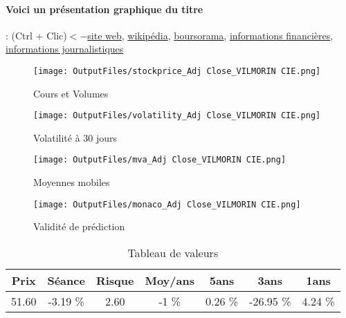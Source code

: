 \documentclass[11pt,a4paper]{report}%
\begin{document}
\paragraph{Voici un présentation graphique du titre} : (Ctrl + Clic)$<-$\href{https://www.vilmorincie.com/fr/investisseurs-analystes/}{site web}, \href{https://fr.wikipedia.org/wiki/Vilmorin_%26_Cie}{wikipédia}, \href{https://www.boursorama.com/cours/1rPRIN}{boursorama}, \href{https://www.qwant.com/?q=site:https:%2f%2fwww.easybourse.com%2faction-societe%2fVILMORIN-CIE&t=web&client=ext-firefox-hp}{informations financières}, \href{https://bourse.lerevenu.com/cours-de-bourse/fiche-valeur-synthese/VILMORIN-CIE/RIN-FR}{informations journalistiques}
\begin{figure}[!htb]
   \begin{minipage}{0.5\textwidth}
     \centering
     \texttt{[image: OutputFiles/stockprice\_Adj Close\_VILMORIN CIE.png]}
     \caption{Cours et Volumes}\label{Fig:price_VILMORIN CIE}
   \end{minipage}\hfill
   \begin{minipage}{0.5\textwidth}
     \centering
     \texttt{[image: OutputFiles/volatility\_Adj Close\_VILMORIN CIE.png]}
     \caption{Volatilité à 30 jours}\label{Fig:volat_VILMORIN CIE}
   \end{minipage}
\end{figure}
\begin{figure}[!htb]
   \begin{minipage}{0.5\textwidth}
     \centering
     \texttt{[image: OutputFiles/mva\_Adj Close\_VILMORIN CIE.png]}
     \caption{Moyennes mobiles}\label{Fig:mva_VILMORIN CIE}
   \end{minipage}\hfill
   \begin{minipage}{0.5\textwidth}
     \centering
     \texttt{[image: OutputFiles/monaco\_Adj Close\_VILMORIN CIE.png]}
     \caption{Validité de prédiction}\label{Fig:prediction_VILMORIN CIE}
   \end{minipage}
\end{figure}

\begin{table}[H]
  \centering
    \begin{tabular}{|c|c|c|c|c|c|c|}
    \hline
    Prix & Séance & Risque  & Moy/ans & 5ans & 3ans & 1ans \\
    \hline
    51.60 &    -3.19 \%    & 2.60 & -1 \% & 0.26 \% & -26.95 \% & 4.24 \% \\
    \hline
    \end{tabular}%
        \label{tab:table_VILMORIN CIE}%
      \caption{Tableau de valeurs}
\end{table}%
\end{document}
